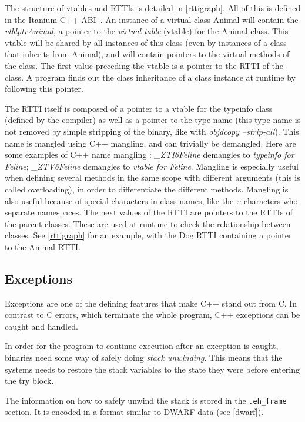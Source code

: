\documentclass[a4paper,11pt,oneside]{report}
\begin{document}
The structure of vtables and RTTIs is detailed in \autoref{rttigraph}.
All of this is defined in the Itanium C++ ABI~\cite{cppabi}.
An instance of a virtual class Animal will contain the \emph{vtblptrAnimal}, 
a pointer to the \emph{virtual table} (vtable) for the Animal class.
This vtable will be shared by all instances of this class (even by instances
of a class that inherits from Animal), and will contain pointers to the virtual
methods of the class.
The first value preceding the vtable is a pointer to the RTTI of the class. A
program finds out the class inheritance of a class instance at runtime by
following this pointer.

The RTTI itself is composed of a pointer to a vtable for the typeinfo class
(defined by the compiler) as well as a pointer to the type name (this type 
name is not removed by simple stripping of the binary, like with 
\emph{objdcopy --strip-all}).
This name is mangled using C++ mangling, and can trivially be demangled.
Here are some examples of C++ name mangling :
\emph{\_ZTI6Feline} demangles to \emph{typeinfo for Feline};
\emph{\_ZTV6Feline} demangles to \emph{vtable for Feline}.
Mangling is especially useful when defining several methods in the same scope 
with different arguments (this is called overloading), in order to
differentiate the different methods.
Mangling is also useful because of special characters in class names, like the
\emph{::} characters who separate namespaces.
The next values of the RTTI are pointers to the RTTIs of the parent classes.
These are used at runtime to check the relationship between classes.
See \autoref{rttigraph} for an example, with the Dog RTTI containing a pointer 
to the Animal RTTI.

\subsection{Exceptions}
\label{exceptions}

Exceptions are one of the defining features that make C++ stand out from C.
In contrast to C errors, which terminate the whole program, C++ exceptions
can be caught and handled.

In order for the program to continue execution after an exception is caught,
binaries need some way of safely doing \emph{stack unwinding}.
This means that the systems needs to restore the stack variables to the state
they were before entering the try block.

The information on how to safely unwind the stack is stored in the
\texttt{.eh\_frame} section. It is encoded in a format similar to DWARF data
(see \autoref{dwarf}).
\end{document}
